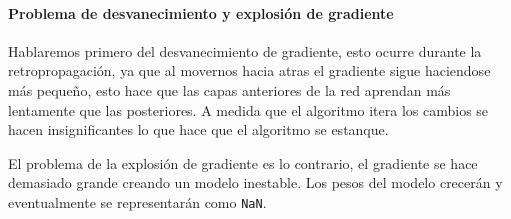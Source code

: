 \paragraph*{Problema de desvanecimiento y explosión de gradiente}
Hablaremos primero del desvanecimiento de gradiente, esto ocurre durante la retropropagación, ya que al movernos hacia atras el gradiente sigue haciendose más pequeño, esto hace que las capas anteriores de la red aprendan más lentamente que las posteriores. A medida que el algoritmo itera los cambios se hacen insignificantes lo que hace que el algoritmo se estanque.

El problema de la explosión de gradiente es lo contrario, el gradiente se hace demasiado grande creando un modelo inestable. Los pesos del modelo crecerán y eventualmente se representarán como \texttt{NaN}.




